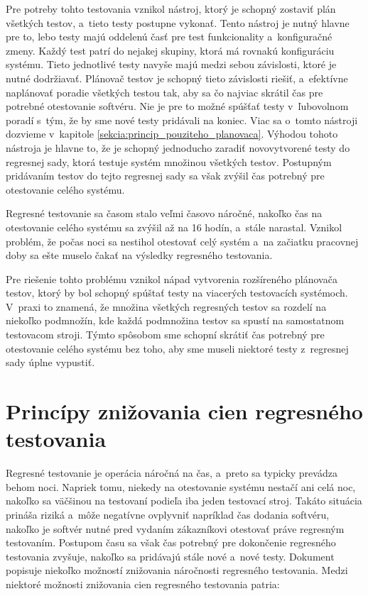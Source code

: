 Pre potreby tohto testovania vznikol nástroj, ktorý je schopný zostaviť 
plán všetkých testov, a~tieto testy postupne vykonať. Tento nástroj je
nutný hlavne pre to, lebo testy majú oddelenú časť pre
test funkcionality a~konfiguračné zmeny. Každý test patrí do nejakej 
skupiny, ktorá má rovnakú konfiguráciu systému. 
Tieto jednotlivé testy navyše majú medzi sebou závislosti, ktoré je 
nutné dodržiavať. Plánovač testov je schopný tieto závislosti riešiť, 
a~efektívne naplánovať poradie všetkých testou tak, aby sa čo najviac 
skrátil čas pre potrebné otestovanie softvéru. Nie je pre to možné spúšťať
testy v~ľubovolnom poradí s~tým, že by sme nové testy pridávali na koniec.
Viac sa o~tomto nástroji dozvieme v~kapitole
\ref{sekcia:princip_pouziteho_planovaca}.
Výhodou tohoto nástroja je hlavne to, že je schopný jednoducho zaradiť 
novovytvorené testy do regresnej sady, ktorá testuje systém množinou 
všetkých testov. Postupným pridávaním testov do tejto regresnej sady sa 
však zvýšil čas potrebný pre otestovanie celého systému.

Regresné testovanie sa časom stalo veľmi časovo náročné, nakoľko čas na 
otestovanie celého systému sa zvýšil až na 16 hodín, a~stále narastal.
Vznikol problém, že počas noci sa nestihol otestovať celý systém a~na 
začiatku pracovnej doby sa ešte muselo čakať na výsledky regresného 
testovania. 

Pre riešenie tohto problému vznikol nápad vytvorenia 
rozšíreného plánovača testov, ktorý by bol schopný spúštať testy na 
viacerých testovacích systémoch.
V~praxi to znamená, že množina všetkých regresných testov sa rozdelí na 
niekoľko podmnožín, kde každá podmnožina testov sa spustí na samostatnom
testovacom stroji. 
Týmto spôsobom sme schopní skrátiť čas potrebný pre otestovanie celého 
systému bez toho, aby sme museli niektoré testy z~regresnej sady 
úplne vypustiť. 

\section{Princípy znižovania cien regresného testovania}
\label{sekcia:principy_znizovania_cien}
Regresné testovanie je operácia náročná na čas, a~preto sa typicky 
prevádza behom noci. Napriek tomu, niekedy na otestovanie systému 
nestačí ani celá noc, nakoľko sa väčšinou na testovaní podieľa iba jeden 
testovací stroj. Takáto situácia prináša riziká a~môže negatívne ovplyvniť 
napríklad čas dodania softvéru, nakoľko je softvér nutné pred vydaním 
zákazníkovi otestovať práve regresným testovaním. Postupom času sa však 
čas potrebný pre dokončenie regresného testovania zvyšuje, nakoľko sa 
pridávajú stále nové a~nové testy. Dokument \cite{Parallel_approach} 
popisuje niekoľko možností znižovania náročnosti regresného testovania.
Medzi niektoré možnosti znižovania cien regresného testovania patria:

